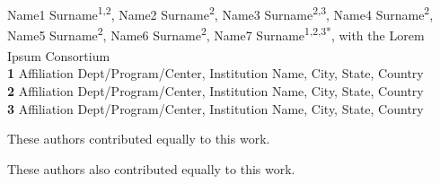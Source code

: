 \documentclass[10pt,letterpaper]{article}
\begin{document}
\vspace*{0.2in}

\begin{flushleft}
{\Large
\textbf{} %
}
\newline
\\
Name1 Surname\textsuperscript{1,2\Yinyang},
Name2 Surname\textsuperscript{2\Yinyang},
Name3 Surname\textsuperscript{2,3\textcurrency},
Name4 Surname\textsuperscript{2},
Name5 Surname\textsuperscript{2\ddag},
Name6 Surname\textsuperscript{2\ddag},
Name7 Surname\textsuperscript{1,2,3*},
with the Lorem Ipsum Consortium\textsuperscript{\textpilcrow}
\\
\bigskip
\textbf{1} Affiliation Dept/Program/Center, Institution Name, City, State, Country
\\
\textbf{2} Affiliation Dept/Program/Center, Institution Name, City, State, Country
\\
\textbf{3} Affiliation Dept/Program/Center, Institution Name, City, State, Country
\\
\bigskip


% 
%
\Yinyang These authors contributed equally to this work.

\ddag These authors also contributed equally to this work.


\end{flushleft}
\end{document}
